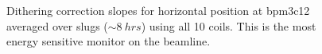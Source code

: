 \begin{figure}[h]
\centering
{}
\caption{Dithering correction slopes for horizontal position at bpm3c12 averaged over slugs ($\sim 8~hrs$) using all 10 coils. This is the most energy sensitive monitor on the beamline.}
\label{fig:10Coil_bmod_E_slopes}
\end{figure}

